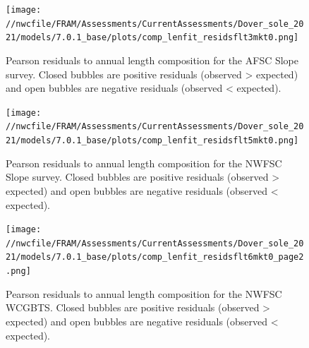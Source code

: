 \documentclass[11pt,
  english,
  a4paper,
]{article}
\begin{document}
\tagmcend\tagstructend


\begin{figure}
\centering
\texttt{[image: //nwcfile/FRAM/Assessments/CurrentAssessments/Dover\_sole\_2021/models/7.0.1\_base/plots/comp\_lenfit\_residsflt3mkt0.png]}
\caption{Pearson residuals to annual length composition for the AFSC Slope survey. Closed bubbles are positive residuals (observed \textgreater{} expected) and open bubbles are negative residuals (observed \textless{} expected).\label{fig:afsc-pearson}}
\end{figure}

\tagmcend\tagstructend


\begin{figure}
\centering
\texttt{[image: //nwcfile/FRAM/Assessments/CurrentAssessments/Dover\_sole\_2021/models/7.0.1\_base/plots/comp\_lenfit\_residsflt5mkt0.png]}
\caption{Pearson residuals to annual length composition for the NWFSC Slope survey. Closed bubbles are positive residuals (observed \textgreater{} expected) and open bubbles are negative residuals (observed \textless{} expected).\label{fig:nwslope-pearson}}
\end{figure}

\tagmcend\tagstructend


\begin{figure}
\centering
\texttt{[image: //nwcfile/FRAM/Assessments/CurrentAssessments/Dover\_sole\_2021/models/7.0.1\_base/plots/comp\_lenfit\_residsflt6mkt0\_page2.png]}
\caption{Pearson residuals to annual length composition for the NWFSC WCGBTS. Closed bubbles are positive residuals (observed \textgreater{} expected) and open bubbles are negative residuals (observed \textless{} expected).\label{fig:wcgbt-pearson}}
\end{figure}
\end{document}
